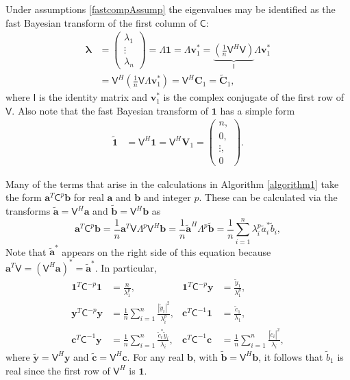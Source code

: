 \documentclass{iitthesis}          %
\newcommand{\bm}[1]{\boldsymbol{#1}}
\newcommand{\vlambda}{{\bm{\lambda}}}
\newcommand{\va}{\bm{a}}
\newcommand{\vb}{\bm{b}}
\newcommand{\vc}{\bm{c}}
\newcommand{\vC}{\bm{C}}
\newcommand{\vv}{\bm{v}}
\newcommand{\vV}{\bm{V}}
\newcommand{\vy}{\bm{y}}
\newcommand{\vone}{\bm{1}}
\newcommand{\mC}{\mathsf{C}}
\newcommand{\mCInv}{{\mathsf{C}^{-1}}}
\newcommand{\mLambda}{\mathsf{\Lambda}}
\newcommand{\mV}{\mathsf{V}}
\def\abs#1{\ensuremath{\left \lvert #1 \right \rvert}}
\begin{document}
Under assumptions \eqref{fastcompAssump} the eigenvalues may be identified as the fast Bayesian transform of the first column of $\mC$:
\begin{align}
\nonumber
\vlambda 
& = \begin{pmatrix}
\lambda_1 \\ \vdots \\ \lambda_n
\end{pmatrix} = \mLambda \vone = \mLambda \vv_1^* 
= \underbrace{\left( \frac 1n \mV^H  \mV \right) }_{\mathsf{I}} \mLambda \vv_1^* \\
&= \mV^H \left( \frac 1n \mV \mLambda \vv_1^* \right)
= \mV^H \vC_1 =  \widetilde{\vC}_1,
\label{eqn:fast_transform_to_eigvalues}
\end{align}
where $\mathsf{I}$ is the identity matrix and $\vv_1^*$ is the complex conjugate of the first row of $\mV$. 
Also note that the fast Bayesian transform of $\vone$ has a simple form
\begin{align*} 
\widetilde{\vone}
& = \mV^H \vone = \mV^H \vV_1 = \begin{pmatrix}n, \\ 0, \\ \vdots, \\ 0 \end{pmatrix}.
\label{eqn:fast_transform_one}
\end{align*}

Many of the terms that arise in the calculations in  Algorithm \ref{algorithm1} take the form $\va^T\mC^{p}\vb$ for real $\va$ and $\vb$ and integer $p$.  These can be calculated via the transforms $\widetilde{\va} = \mV^H \va$ and $\widetilde{\vb} = \mV^H \vb$ as 
\begin{equation*}
\va^T\mC^p\vb = \frac 1n \va^T \mV \mLambda^p \mV^H \vb
= \frac 1n \widetilde{\va}^H\mLambda^p \widetilde{\vb}
= \frac 1n \sum_{i=1}^n \lambda_i^p \widetilde{a}_i^* \widetilde{b}_i, 
\end{equation*}
Note that $\widetilde{\va}^*$ appears on the right side of this equation because $\va^T \mV = (\mV^H \va)^* = \widetilde{\va}^*$. In particular,
\begin{align*}
\vone^T\mC^{-p}\vone & = \frac{n}{\lambda_1^p},
&
\vone^T\mC^{-p}\vy &= \frac{\widetilde{y}_1}{\lambda_1^p},
\\
\vy^T\mC^{-p} \vy &= \frac 1n \sum_{i=1}^n \frac{\abs{\widetilde{y}_i}^2}{\lambda_i^p},
&
\vc^T\mCInv \vone &= \frac{\widetilde{c}_1}{\lambda_1},\\
\vc^T\mCInv \vy &= \frac 1n \sum_{i=1}^n \frac{\widetilde{c}_i^* \widetilde{y}_i}{\lambda_i}, & 
\vc^T\mCInv \vc &= \frac 1n \sum_{i=1}^n \frac{\abs{\widetilde{c}_i}^2}{\lambda_i},
\end{align*}
where $\widetilde{\vy} = \mV^H \vy$ and 
$\widetilde{\vc} = \mV^H \vc$.  For any real $\vb$, with $\widetilde{\vb} = \mV^H\vb$, it follows that $\widetilde{b}_1$ is real since the first row of $\mV^H$ is $\vone$.
\end{document}
